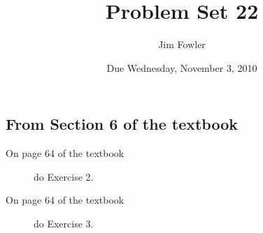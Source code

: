 \documentclass[12pt]{handout}
\author{Jim Fowler}
\title{Problem Set 22}
\date{Due Wednesday, November  3, 2010}
\begin{document}
\maketitle










\subsection*{From Section 6 of the textbook}



\begin{description}

\item[On page 64 of the textbook] do Exercise 2.

\item[On page 64 of the textbook] do Exercise 3.

\end{description}
\end{document}
